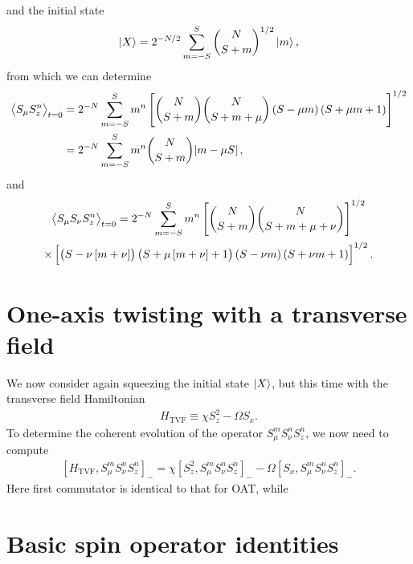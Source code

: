 \documentclass[aps,notitlepage,nofootinbib,11pt]{revtex4-1}
\renewcommand{\t}{\text} %
\newcommand{\p}[1]{\left(#1\right)} %
\renewcommand{\sp}[1]{\left[#1\right]} %
\newcommand{\bk}{\Braket} %
\newcommand{\1}{\mathds{1}}
\begin{document}
and the initial state
\begin{align}
  \ket{X} = 2^{-N/2} \sum_{m=-S}^S { N \choose S+m }^{1/2} \ket{m},
\end{align}
from which we can determine
\begin{align}
  \bk{S_\mu S_z^n}_{t=0}
  &= 2^{-N} \sum_{m=-S}^S m^n
  \sp{{ N \choose S+m } { N \choose S+m+\mu }
    \p{S-\mu m}\p{S+\mu m+1}}^{1/2} \\
  &= 2^{-N} \sum_{m=-S}^S m^n { N \choose S+m } \abs{m - \mu S},
\end{align}
and
\begin{multline}
  \bk{S_\mu S_\nu S_z^n}_{t=0}
  = 2^{-N} \sum_{m=-S}^S m^n
  \sp{{ N \choose S+m } { N \choose S+m+\mu+\nu }}^{1/2} \\
  \times \sp{\p{S-\nu\sp{m+\nu}}\p{S+\mu\sp{m+\nu}+1}
    \p{S-\nu m}\p{S+\nu m+1}}^{1/2}.
\end{multline}


\section{One-axis twisting with a transverse field}

We now consider again squeezing the initial state $\ket{X}$, but this
time with the transverse field Hamiltonian
\begin{align}
  H_{\t{TVF}}
  \equiv \chi S_z^2- \Omega S_x.
\end{align}
To determine the coherent evolution of the operator
$S_\mu^m S_\nu^n S_z^n$, we now need to compute
\begin{align}
  \sp{H_{\t{TVF}}, S_\mu^m S_\nu^n S_z^n}_-
  = \chi \sp{S_z^2, S_\mu^m S_\nu^n S_z^n}_-
  - \Omega \sp{S_x, S_\mu^m S_\nu^n S_z^n}_-.
\end{align}
Here first commutator is identical to that for OAT, while




\newpage
\appendix

\section{Basic spin operator identities}
\label{sec:identities}
\end{document}
